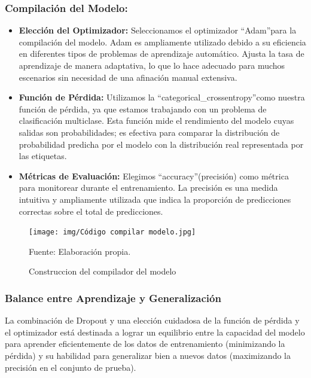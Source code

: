\subsubsection{Compilación del Modelo:} 
\begin{itemize}
    \item \textbf{Elección del Optimizador:} Seleccionamos el optimizador \textquotedblleft Adam\textquotedblright para la compilación del modelo. Adam es ampliamente utilizado debido a su eficiencia en diferentes tipos de problemas de aprendizaje automático. Ajusta la tasa de aprendizaje de manera adaptativa, lo que lo hace adecuado para muchos escenarios sin necesidad de una afinación manual extensiva.
    \item \textbf{Función de Pérdida:} Utilizamos la \textquotedblleft categorical\_crossentropy\textquotedblright como nuestra función de pérdida, ya que estamos trabajando con un problema de clasificación multiclase. Esta función mide el rendimiento del modelo cuyas salidas son probabilidades; es efectiva para comparar la distribución de probabilidad predicha por el modelo con la distribución real representada por las etiquetas.
    \item \textbf{Métricas de Evaluación:} Elegimos \textquotedblleft accuracy\textquotedblright (precisión) como métrica para monitorear durante el entrenamiento. La precisión es una medida intuitiva y ampliamente utilizada que indica la proporción de predicciones correctas sobre el total de predicciones.
\end{itemize}

\begin{figure}[H]
    \begin{minipage}[t]{0.9\textwidth}
        \caption{Construccion del compilador del modelo}
        \label{compilar_modelo}        
    \end{minipage}

    \vspace{10pt}

    \begin{minipage}[b]{1\textwidth}
        \centering
        \texttt{[image: img/Código compilar modelo.jpg]}        
    \end{minipage}

    \begin{minipage}[t]{0.9\textwidth}
        Fuente: Elaboración propia.
    \end{minipage}
\end{figure}

\subsubsection{Balance entre Aprendizaje y Generalización} 
La combinación de Dropout y una elección cuidadosa de la función de pérdida y el optimizador está destinada a lograr un equilibrio entre la capacidad del modelo para aprender eficientemente de los datos de entrenamiento (minimizando la pérdida) y su habilidad para generalizar bien a nuevos datos (maximizando la precisión en el conjunto de prueba).


